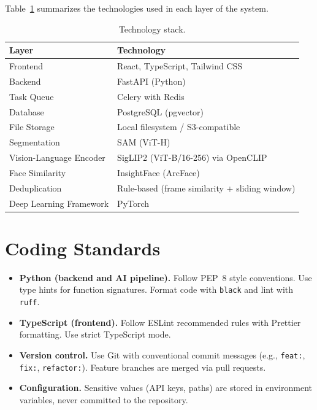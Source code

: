Table~\ref{tab:tech-stack} summarizes the technologies used in each layer of the system.

\begin{table}[H]
    \centering
    \begin{tabular}{ll}
        \toprule
        \textbf{Layer} & \textbf{Technology} \\
        \midrule
        Frontend & React, TypeScript, Tailwind CSS \\
        Backend & FastAPI (Python) \\
        Task Queue & Celery with Redis \\
        Database & PostgreSQL (pgvector) \\
        File Storage & Local filesystem / S3-compatible \\
        Segmentation & SAM (ViT-H) \\
        Vision-Language Encoder & SigLIP2 (ViT-B/16-256) via OpenCLIP \\
        Face Similarity & InsightFace (ArcFace) \\
        Deduplication & Rule-based (frame similarity + sliding window) \\
        Deep Learning Framework & PyTorch \\
        \bottomrule
    \end{tabular}
    \caption{Technology stack.}
    \label{tab:tech-stack}
\end{table}

\section{Coding Standards}
\label{section:coding-standards}

\begin{itemize}
    \item \textbf{Python (backend and AI pipeline).} Follow PEP~8 style conventions. Use type hints for function signatures. Format code with \texttt{black} and lint with \texttt{ruff}.
    \item \textbf{TypeScript (frontend).} Follow ESLint recommended rules with Prettier formatting. Use strict TypeScript mode.
    \item \textbf{Version control.} Use Git with conventional commit messages (e.g., \texttt{feat:}, \texttt{fix:}, \texttt{refactor:}). Feature branches are merged via pull requests.
    \item \textbf{Configuration.} Sensitive values (API keys, paths) are stored in environment variables, never committed to the repository.
\end{itemize}

